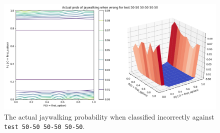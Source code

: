 \documentclass{report}
\newcommand{\code}{\texttt}
\begin{document}
\begin{figure}[h]
    \centering
    \includegraphics[width=\textwidth]{test_50-50_50-50_50-50_jay_prob.png}
    \caption[]{The actual jaywalking probability when classified incorrectly against \code{test 50-50 50-50 50-50}.}
    \label{fig:test_50-50_50-50_50-50_jay_prob_plot}
\end{figure}
\end{document}
